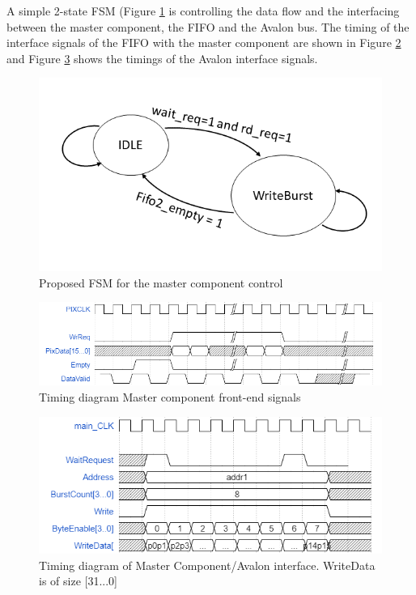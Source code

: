 \documentclass{article}
\begin{document}
A simple 2-state FSM (Figure \ref{fig:master_control} is controlling the data flow and the interfacing between the master component, the FIFO and the Avalon bus. The timing of the interface signals of the FIFO with the master component are shown in Figure \ref{fig:timingMasterfront} and Figure \ref{fig:timingMasterAvalon} shows the timings of the Avalon interface signals.

\begin{figure}[H]
\centering
\includegraphics{master_control.png}
\caption{Proposed FSM for the master component control}
\label{fig:master_control}
\end{figure}

\begin{figure}[H]
\centering
\includegraphics[scale=0.4]{timing3.PNG}
\caption{Timing diagram Master component front-end signals}
\label{fig:timingMasterfront}
\end{figure}

\begin{figure}[H]
\centering
\includegraphics[scale=0.5]{timing4.PNG}
\caption{Timing diagram of Master Component/Avalon interface. WriteData is of size [31...0]}
\label{fig:timingMasterAvalon}
\end{figure}
\end{document}
